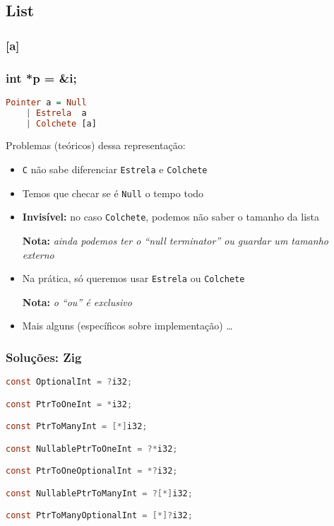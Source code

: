 \documentclass{beamer}
\newcommand{\nota}[1]{\textbf{Nota:}\textit{ #1}}
\begin{document}
\subsection{List}
\begin{frame}
    \frametitle{[a]}
\end{frame}

\begin{frame}[fragile]
    \frametitle{int *p = \&i;}
    \begin{lstlisting}[language=Haskell]
Pointer a = Null
    | Estrela  a
    | Colchete [a]
    \end{lstlisting}
    \vfill
    Problemas (teóricos) dessa representação:
    \begin{itemize}
        \item
            \texttt{C} não sabe diferenciar
            \texttt{Estrela} e \texttt{Colchete}
        \item
            Temos que checar se é \texttt{Null} o tempo todo
        \item
            \textbf{Invisível:} no caso \texttt{Colchete},
            podemos não saber o tamanho da lista
            \par
            \nota{ainda podemos ter o ``null terminator''
            ou guardar um tamanho externo}
        \item
            Na prática, só queremos usar
            \texttt{Estrela} ou \texttt{Colchete}
            \par
            \nota{o ``ou'' é exclusivo}
        \item
            Mais alguns (específicos sobre implementação) \dots
    \end{itemize}
\end{frame}

\begin{frame}[fragile]
    \frametitle{Soluções: Zig}
    \begin{lstlisting}[language=C]
const OptionalInt = ?i32;

const PtrToOneInt = *i32;

const PtrToManyInt = [*]i32;

const NullablePtrToOneInt = ?*i32;

const PtrToOneOptionalInt = *?i32;

const NullablePtrToManyInt = ?[*]i32;

const PtrToManyOptionalInt = [*]?i32;
    \end{lstlisting}
\end{frame}
\end{document}
